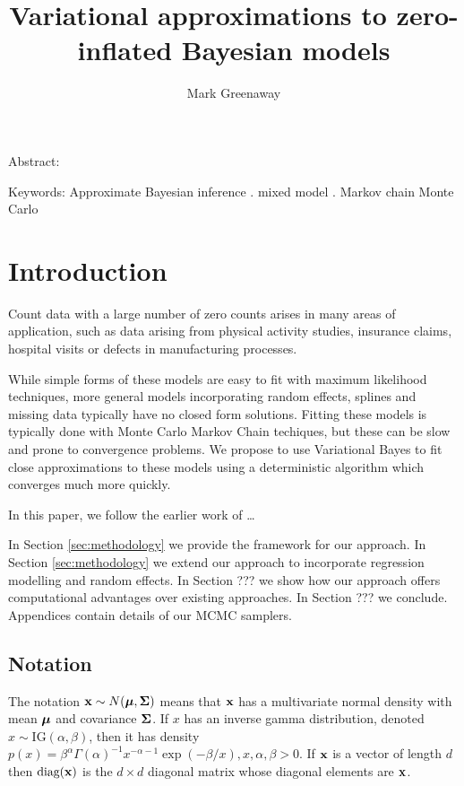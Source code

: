 \documentclass{article}[12pt]
\title{Variational approximations to zero-inflated Bayesian models}
\author{Mark Greenaway}
\begin{document}
\maketitle

Abstract:

Keywords: Approximate Bayesian inference . mixed model . Markov chain Monte Carlo

\section{Introduction}

\noindent Count data with a large number of zero counts arises in many areas of
application, such as data arising from physical activity studies, 
insurance claims, hospital visits or defects in manufacturing processes.

While simple forms of these models are easy to fit with maximum likelihood techniques,
more general models incorporating random effects, splines and missing data typically
have no closed form solutions. Fitting these models is typically done with Monte Carlo
Markov Chain techiques, but these can be slow and prone to convergence problems. We
propose to use Variational Bayes to fit close approximations to these models
using a deterministic algorithm which converges much more quickly.



In this paper, we follow the earlier work of \ldots

In Section \ref{sec:methodology} we provide the framework for our approach. In
Section \ref{sec:methodology} we extend our approach to incorporate regression modelling
and random effects. In Section ??? we show how our approach offers computational
advantages over existing approaches. In Section ??? we conclude. Appendices contain
details of our MCMC samplers.

\subsection{Notation}

The notation ${\bf x} \sim N({\boldsymbol \mu}, {\boldsymbol \Sigma})$ means that ${\bf x}$ has a multivariate normal
density with mean ${\boldsymbol \mu}$ and covariance ${\boldsymbol \Sigma}$. If $x$ has an inverse gamma
distribution, denoted $x \sim \mbox{IG}(\alpha, \beta)$, then it has density
$p(x) = \beta^\alpha \Gamma(\alpha)^{-1}x^{-\alpha-1} \exp{(-\beta/x)}, x, \alpha,
\beta > 0$.
If ${\bf x}$ is a vector of length $d$ then $\mbox{diag}({\bf x})$ is the $d \times d$
diagonal matrix whose diagonal elements are ${\bf x}$.
\end{document}
